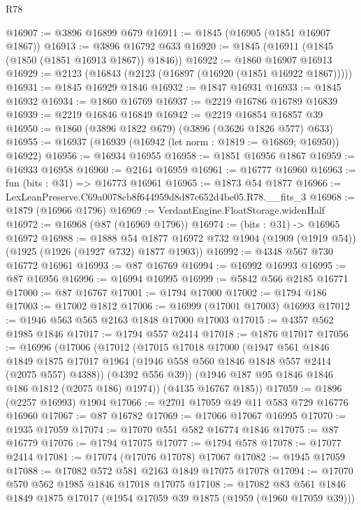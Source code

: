 \begin{lexlean}{R78}
\begin{coremodule}
@16907 := @3896 @16899 @679
@16911 := @1845 (@16905 (@1851 @16907 @1867))
@16913 := @3896 @16792 @633
@16920 := @1845 (@16911 (@1845 (@1850 (@1851 @16913 @1867)) @1846))
@16922 := @1860 @16907 @16913
@16929 := @2123 (@16843 (@2123 (@16897 (@16920 (@1851 @16922 @1867)))))
@16931 := @1845 @16929 @1846
@16932 := @1847 @16931
@16933 := @1845 @16932
@16934 := @1860 @16769
@16937 := @2219 @16786 @16789 @16839
@16939 := @2219 @16846 @16849
@16942 := @2219 @16854 @16857 @39
@16950 := @1860 (@3896 @1822 @679) (@3896 (@3626 @1826 @577) @633)
@16955 := @16937 (@16939 (@16942 (let norm : @1819 := @16869; @16950)) @16922)
@16956 := @16934 @16955
@16958 := @1851 @16956 @1867
@16959 := @16933 @16958
@16960 := @2164 @16959
@16961 := @16777 @16960
@16963 := fun (bits : @31) => @16773 @16961
@16965 := @1873 @54 @1877
@16966 := LexLeanPreserve.C69a0078cb8f644959d8d87c652d4be05.R78.__fits_3
@16968 := @1879 (@16966 @1796)
@16969 := VerdantEngine.FloatStorage.widenHalf
@16972 := @16968 (@87 (@16969 @1796))
@16974 := (bits : @31) -> @16965 @16972
@16988 := @1888
    @54
    @1877
    @16972
    @732
    @1904
    (@1909 (@1919 @54))
    (@1925 (@1926 (@1927 @732) @1877 @1903))
@16992 := @4348 @567 @730 @16772 @16961
@16993 := @87 @16769
@16994 := @16992 @16993
@16995 := @87 @16956
@16996 := @16994 @16995
@16999 := @5842 @566 @2185 @16771
@17000 := @87 @16767
@17001 := @1794 @17000
@17002 := @1794 @186
@17003 := @17002 @1812
@17006 := @16999 (@17001 @17003) @16993
@17012 := @1946 @563 @565 @2163 @1848 @17000 @17003
@17015 := @4357 @562 @1985 @1846
@17017 := @1794 @557 @2414
@17018 := @1876 @17017
@17056 := @16996
    (@17006
      (@17012
        (@17015
          @17018
          @17000
          (@1947
            @561
            @1846
            @1849
            @1875
            @17017
            @1964
            (@1946 @558 @560 @1846 @1848 @557 @2414 (@2075 @557) @4388))
          (@4392 @556 @39))
        (@1946 @187 @95 @1846 @1846 @186 @1812 (@2075 @186) @1974))
      (@4135 @16767 @185))
@17059 := @1896 (@2257 @16993) @1904
@17066 := @2701 @17059 @49 @11 @583 @729 @16776 @16960
@17067 := @87 @16782
@17069 := @17066 @17067 @16995
@17070 := @1935 @17059
@17074 := @17070 @551 @582 @16774 @1846
@17075 := @87 @16779
@17076 := @1794 @17075
@17077 := @1794 @578
@17078 := @17077 @2414
@17081 := @17074 (@17076 @17078) @17067
@17082 := @1945 @17059
@17088 := @17082 @572 @581 @2163 @1849 @17075 @17078
@17094 := @17070 @570 @562 @1985 @1846 @17018 @17075
@17108 := @17082
    @83
    @561
    @1846
    @1849
    @1875
    @17017
    (@1954 @17059 @39 @1875 (@1959 (@1960 @17059 @39)))

\end{coremodule}
\end{lexlean}
